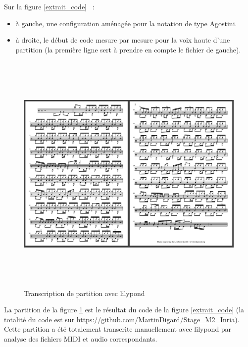 Sur la figure \ref{extrait_code}~ :
\begin{itemize}
    \item à gauche, une configuration aménagée pour la notation de type Agostini.
    \item à droite, le début de code mesure par mesure pour la voix haute
        d’une partition (la première ligne sert à prendre en compte le fichier
        de gauche).
\end{itemize}

\begin{figure}[h]
    \includegraphics[height=120mm, width=160mm]{
    z_images/4_experimentations/1_analyses/3_partition.png}
    \caption{Transcription de partition avec lilypond}
	\label{partition_ref}
\end{figure}

La partition de la figure \ref{partition_ref} est le résultat du code de la
figure \ref{extrait_code} (la totalité du code est sur
\url{https://github.com/MartinDigard/Stage_M2_Inria}). Cette partition a été totalement transcrite
manuellement avec lilypond par analyse des fichiers MIDI et audio
correspondants.

